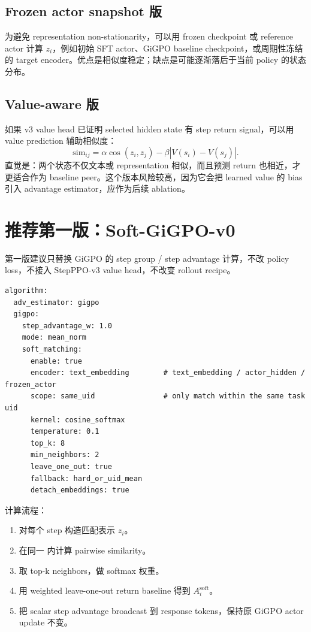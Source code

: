 \documentclass[10pt]{ctexart}
\begin{document}
\subsection{Frozen actor snapshot 版}
为避免 representation non-stationarity，可以用 frozen checkpoint 或 reference actor 计算 $z_i$，例如初始 SFT actor、GiGPO baseline checkpoint，或周期性冻结的 target encoder。优点是相似度稳定；缺点是可能逐渐落后于当前 policy 的状态分布。

\subsection{Value-aware 版}
如果 v3 value head 已证明 selected hidden state 有 step return signal，可以用 value prediction 辅助相似度：
\begin{equation}
  \mathrm{sim}_{ij}=\alpha\cos(z_i,z_j)-\beta |V(s_i)-V(s_j)|.
\end{equation}
直觉是：两个状态不仅文本或 representation 相似，而且预测 return 也相近，才更适合作为 baseline peer。这个版本风险较高，因为它会把 learned value 的 bias 引入 advantage estimator，应作为后续 ablation。

\section{推荐第一版：Soft-GiGPO-v0}
第一版建议只替换 GiGPO 的 step group / step advantage 计算，不改 policy loss，不接入 StepPPO-v3 value head，不改变 rollout recipe。

\begin{lstlisting}
algorithm:
  adv_estimator: gigpo
  gigpo:
    step_advantage_w: 1.0
    mode: mean_norm
    soft_matching:
      enable: true
      encoder: text_embedding        # text_embedding / actor_hidden / frozen_actor
      scope: same_uid                # only match within the same task uid
      kernel: cosine_softmax
      temperature: 0.1
      top_k: 8
      min_neighbors: 2
      leave_one_out: true
      fallback: hard_or_uid_mean
      detach_embeddings: true
\end{lstlisting}

计算流程：
\begin{enumerate}
  \item 对每个 step 构造匹配表示 $z_i$。
  \item 在同一  内计算 pairwise similarity。
  \item 取 top-k neighbors，做 softmax 权重。
  \item 用 weighted leave-one-out return baseline 得到 $A_i^{\mathrm{soft}}$。
  \item 把 scalar step advantage broadcast 到 response tokens，保持原 GiGPO actor update 不变。
\end{enumerate}
\end{document}
